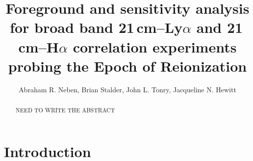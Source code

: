 \documentclass[numberedappendix]{emulateapj}
\begin{document}
\title{Foreground and sensitivity analysis for broad band 21\,\MakeLowercase{cm}--L\MakeLowercase{y}$\alpha$ and 21\,\MakeLowercase{cm}--H$\alpha$ correlation experiments probing the Epoch of Reionization}


\author{Abraham R. Neben,
Brian Stalder,
John L. Tonry,
Jacqueline N. Hewitt}




\begin{abstract}
NEED TO WRITE THE ABSTRACT
\end{abstract}


\section{Introduction}
\end{document}
